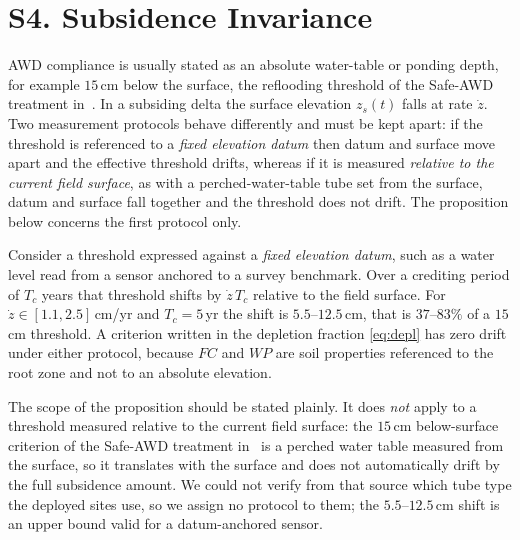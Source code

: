 \section*{S4. Subsidence Invariance}

AWD compliance is usually stated as an absolute water-table or ponding depth,
for example $15$\,cm below the surface, the reflooding threshold of the Safe-AWD
treatment in~\cite{balaine2019}. In a subsiding delta
the surface elevation $z_s(t)$ falls at rate $\dot z$. Two measurement protocols
behave differently and must be kept apart: if the threshold is referenced to a
\emph{fixed elevation datum} then datum and surface move apart and the effective
threshold drifts, whereas if it is measured \emph{relative to the current field
surface}, as with a perched-water-table tube set from the surface, datum and surface
fall together and the threshold does not drift. The proposition below concerns the
first protocol only.

\begin{proposition}
\label{prop:subsid}
Consider a threshold expressed against a \emph{fixed elevation datum}, such as a
water level read from a sensor anchored to a survey benchmark. Over a crediting
period of $T_c$ years that threshold shifts by $\dot z\,T_c$ relative to the field
surface. For $\dot z\in[1.1,2.5]$\,cm/yr and $T_c=5$\,yr the shift is
$5.5$--$12.5$\,cm, that is $37$--$83\%$ of a $15$\,cm threshold. A criterion
written in the depletion fraction \eqref{eq:depl} has zero drift under either
protocol, because $FC$ and $WP$ are soil properties referenced to the root zone
and not to an absolute elevation.
\end{proposition}

The scope of the proposition should be stated plainly. It does \emph{not} apply to
a threshold measured relative to the current field surface: the $15$\,cm
below-surface criterion of the Safe-AWD treatment in~\cite{balaine2019} is a
perched water table measured from the surface, so it translates with the surface
and does not automatically drift by the full subsidence amount. We could not verify
from that source which tube type the deployed sites use, so we assign no protocol
to them; the $5.5$--$12.5$\,cm shift is an upper bound valid for a datum-anchored
sensor.

